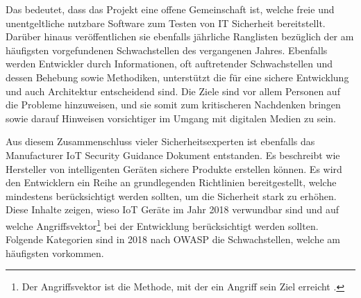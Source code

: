         Das bedeutet, dass das Projekt eine offene Gemeinschaft ist, welche freie und unentgeltliche nutzbare Software zum Testen von IT Sicherheit bereitstellt. Darüber hinaus veröffentlichen sie ebenfalls jährliche Ranglisten bezüglich der am häufigsten vorgefundenen Schwachstellen des vergangenen Jahres. Ebenfalls werden Entwickler durch Informationen, oft auftretender Schwachstellen und dessen Behebung sowie Methodiken, unterstützt die für eine sichere Entwicklung und auch Architektur entscheidend sind. Die Ziele sind vor allem Personen auf die Probleme hinzuweisen, und sie somit zum kritischeren Nachdenken bringen sowie darauf Hinweisen vorsichtiger im Umgang mit digitalen Medien zu sein.
        
        Aus diesem Zusammenschluss vieler Sicherheitsexperten ist ebenfalls das Manufacturer \ac{IoT} Security Guidance Dokument \cite{stahl_2017} entstanden. Es beschreibt wie Hersteller von intelligenten Geräten sichere Produkte erstellen können. Es wird den Entwicklern ein Reihe an grundlegenden Richtlinien bereitgestellt, welche mindestens berücksichtigt werden sollten, um die Sicherheit stark zu erhöhen.
        Diese Inhalte zeigen, wieso \ac{IoT} Geräte im Jahr 2018 verwundbar sind und auf welche Angriffsvektor\footnote{Der Angriffsvektor ist die Methode, mit der ein Angriff sein Ziel erreicht \cite{HANSMAN200531}.} bei der Entwicklung berücksichtigt werden sollten. 
        Folgende Kategorien sind in 2018 nach \ac{OWASP} die Schwachstellen, welche am häufigsten vorkommen. 
